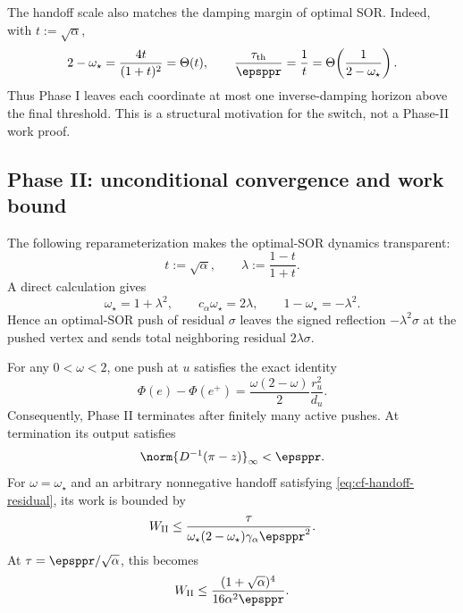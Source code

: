 The handoff scale also matches the damping margin of optimal SOR.  Indeed,
with \(t:=\sqrt\alpha\),
\begin{equation}
    2-\omega_\star
    =\frac{4t}{(1+t)^2}
    =\Theta(t),
    \qquad
    \frac{\tau_{\rm th}}{\epsppr}
    =\frac1t
    =\Theta\!\left(\frac{1}{2-\omega_\star}\right).
    \label{eq:cf-damping-horizon}
\end{equation}
Thus Phase I leaves each coordinate at most one inverse-damping horizon above
the final threshold.  This is a structural motivation for the switch, not a
Phase-II work proof.

\subsection{Phase II: unconditional convergence and work bound}
\label{subsec:cf-phase-two}

The following reparameterization makes the optimal-SOR dynamics transparent:
\begin{equation}
    t:=\sqrt\alpha,
    \qquad
    \lambda:=\frac{1-t}{1+t}.
    \label{eq:cf-lambda}
\end{equation}
A direct calculation gives
\begin{equation}
    \omega_\star=1+\lambda^2,
    \qquad
    c_\alpha\omega_\star=2\lambda,
    \qquad
    1-\omega_\star=-\lambda^2.
    \label{eq:cf-opt-sor-identities}
\end{equation}
Hence an optimal-SOR push of residual \(\sigma\) leaves the signed reflection
\(-\lambda^2\sigma\) at the pushed vertex and sends total neighboring residual
\(2\lambda \sigma\).

\begin{theorem}
\label{thm:cf-phase-two-convergence}
For any \(0<\omega<2\), one push at \(u\) satisfies the exact identity
\begin{equation}
    \Phi(e)-\Phi(e^+)
    =\frac{\omega(2-\omega)}{2}\frac{r_u^2}{d_u}.
    \label{eq:cf-energy-descent}
\end{equation}
Consequently, Phase II terminates after finitely many active pushes.  At
termination its output satisfies
\begin{equation}
    \norm{D^{-1}(\pi-z)}_\infty<\epsppr.
    \label{eq:cf-final-certificate}
\end{equation}
For \(\omega=\omega_\star\) and an arbitrary nonnegative handoff satisfying
\cref{eq:cf-handoff-residual}, its work is bounded by
\begin{equation}
    W_{\rm II}
    \leq
    \frac{\tau}
         {\omega_\star(2-\omega_\star)
          \gamma_\alpha\epsppr^2}.
    \label{eq:cf-phase-two-energy-bound}
\end{equation}
At \(\tau=\epsppr/\sqrt\alpha\), this becomes
\begin{equation}
    W_{\rm II}
    \leq
    \frac{(1+\sqrt\alpha)^4}{16\alpha^2\epsppr}.
    \label{eq:cf-phase-two-explicit-upper}
\end{equation}
\end{theorem}

